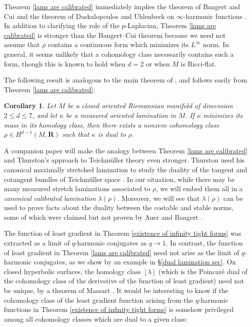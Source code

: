 \documentclass[reqno,11pt]{amsart}
\newcommand{\RR}{\mathbf{R}}
\newcommand{\dfn}[1]{\emph{#1}\index{#1}}
\newtheorem{corollary}[theorem]{Corollary}
\theoremstyle{definition}
\numberwithin{equation}{section}
\begin{document}
Theorem \ref{lams are calibrated} immediately implies the theorem of Bangert and Cui \cite{bangert_cui_2017} and the theorem of Daskalopoulos and Uhlenbeck on $\infty$-harmonic functions \cite{daskalopoulos2020transverse}.
In addition to clarifying the role of the $p$-Laplacian, Theorem \ref{lams are calibrated} is stronger than the Bangert--Cui theorem because we need not assume that $\rho$ contains a continuous form which minimizes its $L^\infty$ norm.
In general, it seems unlikely that a cohomology class necessarily contains such a form, though this is known to hold when $d = 2$ \cite{Evans08} or when $M$ is Ricci-flat. 

The following result is analogous to the main theorem of \cite{Mazon14}, and follows easily from Theorem \ref{lams are calibrated}:

\begin{corollary}\label{every minimizer is dual}
Let $M$ be a closed oriented Riemannian manifold of dimension $2 \leq d \leq 7$, and let $\kappa$ be a measured oriented lamination in $M$.
If $\kappa$ minimizes its mass in its homology class, then there exists a nonzero cohomology class $\rho \in H^{d - 1}(M, \RR)$ such that $\kappa$ is dual to $\rho$.
\end{corollary}

A companion paper \cite{BackusBest2} will make the analogy between Theorem \ref{lams are calibrated} and Thurston's approach to Teichm\"uller theory even stronger.
Thurston used his canonical maximally stretched lamination to study the duality of the tangent and cotangent bundles of Teichm\"uller space \cite[\S10]{Thurston98}.
In our situation, while there may be many measured stretch laminations associated to $\rho$, we will embed them all in a \dfn{canonical calibrated lamination} $\lambda(\rho)$.
Moreover, we will see that $\lambda(\rho)$ can be used to prove facts about the duality between the costable and stable norms, some of which were claimed but not proven by Auer and Bangert \cite{Auer01}.

The function of least gradient in Theorem \ref{existence of infinity tight forms} was extracted as a limit of $q$-harmonic conjugates as $q \to 1$.
In contrast, the function of least gradient in Theorem \ref{lams are calibrated} need not arise as the limit of $q$-harmonic conjugates, as we show by an example in \S\ref{dual lamination sec}.
On closed hyperbolic surfaces, the homology class $[\lambda]$ (which is the Poincar\'e dual of the cohomology class of the derivative of the function of least gradient) need not be unique, by a theorem of Massart \cite{Massart1997StableNO}.
It would be interesting to know if the cohomology class of the least gradient function arising from the $q$-harmonic functions in Theorem \ref{existence of infinity tight forms} is somehow privileged among all cohomology classes which are dual to a given class:
\end{document}
